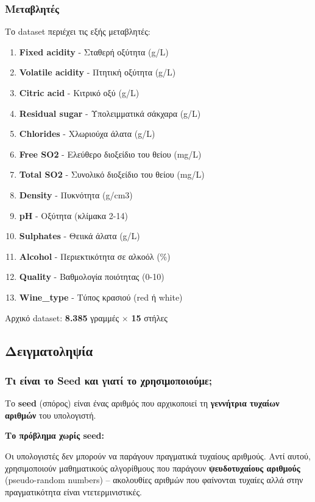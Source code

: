 \documentclass[12pt,a4paper]{article}
\begin{document}
\subsubsection{Μεταβλητές}

Το dataset περιέχει τις εξής μεταβλητές:

\begin{enumerate}
    \item \textbf{Fixed acidity} - Σταθερή οξύτητα (g/L)
    \item \textbf{Volatile acidity} - Πτητική οξύτητα (g/L)
    \item \textbf{Citric acid} - Κιτρικό οξύ (g/L)
    \item \textbf{Residual sugar} - Υπολειμματικά σάκχαρα (g/L)
    \item \textbf{Chlorides} - Χλωριούχα άλατα (g/L)
    \item \textbf{Free SO2} - Ελεύθερο διοξείδιο του θείου (mg/L)
    \item \textbf{Total SO2} - Συνολικό διοξείδιο του θείου (mg/L)
    \item \textbf{Density} - Πυκνότητα (g/cm3)
    \item \textbf{pH} - Οξύτητα (κλίμακα 2-14)
    \item \textbf{Sulphates} - Θειικά άλατα (g/L)
    \item \textbf{Alcohol} - Περιεκτικότητα σε αλκοόλ (\%)
    \item \textbf{Quality} - Βαθμολογία ποιότητας (0-10)
    \item \textbf{Wine\_type} - Τύπος κρασιού (red ή white)
\end{enumerate}

Αρχικό dataset: \textbf{8.385} γραμμές $\times$ \textbf{15} στήλες

\subsection{Δειγματοληψία}

\subsubsection{Τι είναι το Seed και γιατί το χρησιμοποιούμε;}

Το \textbf{seed} (σπόρος) είναι ένας αριθμός που αρχικοποιεί τη \textbf{γεννήτρια τυχαίων αριθμών} του υπολογιστή.

\textbf{Το πρόβλημα χωρίς seed:}

Οι υπολογιστές δεν μπορούν να παράγουν πραγματικά τυχαίους αριθμούς. Αντί αυτού, χρησιμοποιούν μαθηματικούς αλγορίθμους που παράγουν \textbf{ψευδοτυχαίους αριθμούς} (pseudo-random numbers) -- ακολουθίες αριθμών που φαίνονται τυχαίες αλλά στην πραγματικότητα είναι ντετερμινιστικές.
\end{document}

